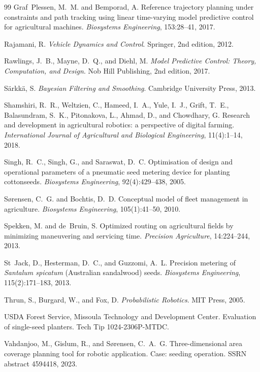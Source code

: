\begin{thebibliography}{99}
Graf~Plessen, M.~M. and Bemporad, A.
Reference trajectory planning under constraints and path tracking using linear time-varying model predictive control for agricultural machines.
\textit{Biosystems Engineering}, 153:28--41, 2017.

Rajamani, R.
\textit{Vehicle Dynamics and Control}.
Springer, 2nd edition, 2012.

Rawlings, J.~B., Mayne, D.~Q., and Diehl, M.
\textit{Model Predictive Control: Theory, Computation, and Design}.
Nob Hill Publishing, 2nd edition, 2017.

S{\"a}rkk{\"a}, S.
\textit{Bayesian Filtering and Smoothing}.
Cambridge University Press, 2013.

Shamshiri, R.~R., Weltzien, C., Hameed, I.~A., Yule, I.~J., Grift, T.~E., Balasundram, S.~K., Pitonakova, L., Ahmad, D., and Chowdhary, G.
Research and development in agricultural robotics: a perspective of digital farming.
\textit{International Journal of Agricultural and Biological Engineering}, 11(4):1--14, 2018.

Singh, R.~C., Singh, G., and Saraswat, D.~C.
Optimisation of design and operational parameters of a pneumatic seed metering device for planting cottonseeds.
\textit{Biosystems Engineering}, 92(4):429--438, 2005.

S{\o}rensen, C.~G. and Bochtis, D.~D.
Conceptual model of fleet management in agriculture.
\textit{Biosystems Engineering}, 105(1):41--50, 2010.

Spekken, M. and de~Bruin, S.
Optimized routing on agricultural fields by minimizing maneuvering and servicing time.
\textit{Precision Agriculture}, 14:224--244, 2013.

St~Jack, D., Hesterman, D.~C., and Guzzomi, A.~L.
Precision metering of \textit{Santalum spicatum} (Australian sandalwood) seeds.
\textit{Biosystems Engineering}, 115(2):171--183, 2013.

Thrun, S., Burgard, W., and Fox, D.
\textit{Probabilistic Robotics}.
MIT Press, 2005.

USDA Forest Service, Missoula Technology and Development Center.
Evaluation of single-seed planters.
Tech Tip 1024-2306P-MTDC.

Vahdanjoo, M., Gislum, R., and S{\o}rensen, C.~A.~G.
Three-dimensional area coverage planning tool for robotic application. Case: seeding operation.
SSRN abstract 4594418, 2023.


\end{thebibliography}
